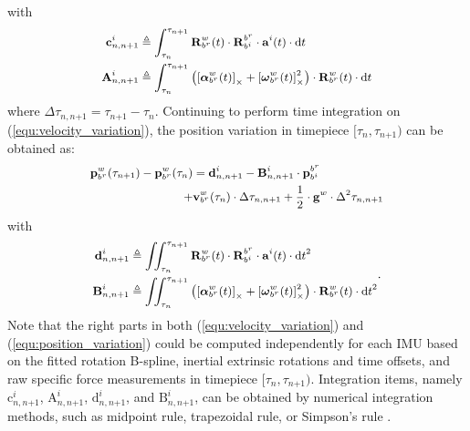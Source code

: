 \documentclass[lettersize,journal,twoside]{IEEEtran}
\newcommand\liehat[1]{\left[ #1 \right]_\times}
\newcommand\bsm[1]{\boldsymbol{\mathrm{#1}}}
\newcommand\rotation[2]{{\bsm{R}_{#1}^{#2}}}
\newcommand\angvel[2]{{\bsm{\omega}_{#1}^{#2}}}
\newcommand\angacce[2]{{\bsm{\alpha}_{#1}^{#2}}}
\newcommand\translation[2]{{\bsm{p}_{#1}^{#2}}}
\newcommand\linvel[2]{{\bsm{v}_{#1}^{#2}}}
\newcommand\gravity[1]{{\bsm{g}^{#1}}}
\newcommand\smallplus{{\text{+}}}
\begin{document}
with
\begin{equation}
\small
\begin{aligned}
\bsm{c}^i_{n,n\smallplus 1}&\triangleq
\int_{\tau_n}^{\tau_{n\smallplus 1}}\rotation{b^r}{w}(t)\cdot\rotation{b^i}{b^r} \cdot\bsm{a}^{i}(t) \cdot \mathrm{d}t
\\
\bsm{A}^i_{n,n\smallplus 1}&\triangleq
\int_{\tau_n}^{\tau_{n\smallplus 1}}\left(\liehat{\angacce{b^r}{w}(t)}+ \liehat{\angvel{b^r}{w}(t)}^2\right) \cdot\rotation{b^r}{w}(t)\cdot \mathrm{d}t
\end{aligned}
\end{equation}
where $\Delta\tau_{n,n\smallplus 1}=\tau_{n\smallplus 1}- \tau_{n}$.
Continuing to perform time integration on (\ref{equ:velocity_variation}), the position variation in timepiece $[\tau_n,\tau_{n\smallplus 1})$ can be obtained as:
\begin{equation}
\small
\label{equ:position_variation}
\begin{aligned}
\translation{b^r}{w}(\tau_{n\smallplus 1})-\translation{b^r}{w}(\tau_n)
&=
\bsm{d}^i_{n,n\smallplus 1}-\bsm{B}^i_{n,n\smallplus 1}
\cdot\translation{b^i}{b^r}
\\
+&\linvel{b^r}{w}(\tau_n)\cdot\Delta\tau_{n,n\smallplus 1}+
\frac{1}{2}\cdot\gravity{w}\cdot\Delta^2\tau_{n,n\smallplus 1}
\end{aligned}
\end{equation}
with
\begin{equation}
\small
\begin{aligned}
\bsm{d}^i_{n,n\smallplus 1}&\triangleq
\iint_{\tau_n}^{\tau_{n\smallplus 1}}\rotation{b^r}{w}(t)\cdot\rotation{b^i}{b^r} \cdot\bsm{a}^{i}(t) \cdot \mathrm{d}t^2
\\
\bsm{B}^i_{n,n\smallplus 1}&\triangleq
\iint_{\tau_n}^{\tau_{n\smallplus 1}}\left(\liehat{\angacce{b^r}{w}(t)}+ \liehat{\angvel{b^r}{w}(t)}^2\right) \cdot\rotation{b^r}{w}(t)\cdot \mathrm{d}t^2
\end{aligned}.
\end{equation}
Note that the right parts in both (\ref{equ:velocity_variation}) and (\ref{equ:position_variation}) could be computed independently for each IMU based on the fitted rotation B-spline, inertial extrinsic rotations and time offsets, and raw specific force measurements in timepiece $[\tau_n,\tau_{n\smallplus 1})$.
Integration items, namely $\bsm{c}^i_{n,n\smallplus 1}$, $\bsm{A}^i_{n,n\smallplus 1}$, $\bsm{d}^i_{n,n\smallplus 1}$, and $\bsm{B}^i_{n,n\smallplus 1}$, can be obtained by numerical integration methods, such as midpoint rule, trapezoidal rule, or Simpson’s rule \cite{suli2003introduction}.
\end{document}
